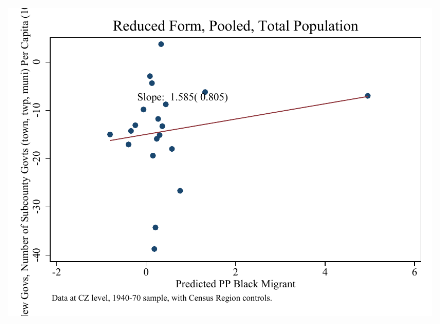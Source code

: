 \documentclass{article}
\begin{document}
\begin{figure}
\centering
\includegraphics{figures/simplefigs/pooled_gen_subcounty_pc_C3_total_rf.pdf}
\end{figure}
\clearpage
\end{document}
